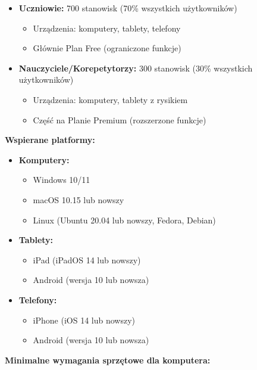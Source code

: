 \documentclass[12pt,a4paper]{article}
\begin{document}
\begin{itemize}[leftmargin=*]
    \item \textbf{Uczniowie:} 700 stanowisk (70\% wszystkich użytkowników)
    \begin{itemize}
        \item Urządzenia: komputery, tablety, telefony
        \item Głównie Plan Free (ograniczone funkcje)
    \end{itemize}
    
    \item \textbf{Nauczyciele/Korepetytorzy:} 300 stanowisk (30\% wszystkich użytkowników)
    \begin{itemize}
        \item Urządzenia: komputery, tablety z rysikiem
        \item Część na Planie Premium (rozszerzone funkcje)
    \end{itemize}
\end{itemize}

\textbf{Wspierane platformy:}

\begin{itemize}[leftmargin=*]
    \item \textbf{Komputery:}
    \begin{itemize}
        \item Windows 10/11
        \item macOS 10.15 lub nowszy
        \item Linux (Ubuntu 20.04 lub nowszy, Fedora, Debian)
    \end{itemize}
    
    \item \textbf{Tablety:}
    \begin{itemize}
        \item iPad (iPadOS 14 lub nowszy)
        \item Android (wersja 10 lub nowsza)
    \end{itemize}
    
    \item \textbf{Telefony:}
    \begin{itemize}
        \item iPhone (iOS 14 lub nowszy)
        \item Android (wersja 10 lub nowsza)
    \end{itemize}
\end{itemize}

\textbf{Minimalne wymagania sprzętowe dla komputera:}
\end{document}

